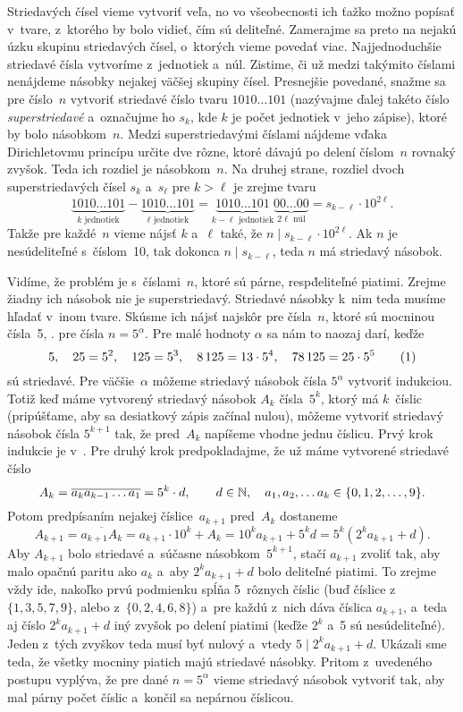 {%
Striedavých čísel vieme vytvoriť veľa, no vo všeobecnosti ich ťažko možno popísať v~tvare, z~ktorého by bolo vidieť, čím sú deliteľné. Zamerajme sa preto na nejakú úzku skupinu striedavých čísel, o~ktorých vieme povedať viac. Najjednoduchšie striedavé čísla vytvoríme z~jednotiek a~núl. Zistime, či už medzi takýmito číslami nenájdeme násobky nejakej väčšej skupiny čísel. Presnejšie povedané, snažme sa pre číslo~$n$ vytvoriť striedavé číslo tvaru $1010\dots101$ (nazývajme ďalej takéto číslo {\it superstriedavé} a~označujme ho $s_k$, kde $k$ je počet jednotiek v~jeho zápise), ktoré by bolo násobkom~$n$. Medzi superstriedavými číslami nájdeme vďaka Dirichletovmu princípu určite dve rôzne, ktoré dávajú po delení číslom~$n$ rovnaký zvyšok. Teda ich rozdiel je násobkom~$n$. Na druhej strane, rozdiel dvoch superstriedavých čísel $s_k$ a~$s_\ell$ pre $k>\ell$ je zrejme tvaru
$$
\underbrace{1010\dots101}_{\text{$k$ jednotiek}}-\underbrace{1010\dots101}_{\text{$\ell$ jednotiek}}=
\underbrace{1010\dots101}_{\text{$k-\ell$ jednotiek}}\!\underbrace{00\dots00}_{\text{$2\ell$ núl}}=
s_{k-\ell}\cdot10^{2\ell}.
$$
Takže pre každé~$n$ vieme nájsť $k$ a~$\ell$ také, že $n\mid s_{k-\ell}\cdot10^{2\ell}$. Ak $n$ je nesúdeliteľné s~číslom~10, tak dokonca $n\mid s_{k-\ell}$, teda $n$ má striedavý násobok. 

Vidíme, že problém je s~číslami~$n$, ktoré sú párne, resp\. deliteľné piatimi. Zrejme žiadny ich násobok nie je superstriedavý. Striedavé násobky k~nim teda musíme hľadať v~inom tvare. Skúsme ich nájsť najskôr pre čísla~$n$, ktoré sú mocninou čísla~5, \tj. pre čísla $n=5^\alpha$. Pre malé hodnoty $\alpha$ sa nám to naozaj darí, keďže
$$
5,\quad 25=5^2,\quad 125=5^3,\quad 8\,125=13\cdot5^4,\quad 78\,125=25\cdot5^5
\tag1
$$
sú striedavé. Pre väčšie~$\alpha$ môžeme striedavý násobok čísla $5^\alpha$ vytvoriť indukciou. Totiž keď máme vytvorený striedavý násobok $A_k$ čísla~$5^k$, ktorý má $k$~číslic (pripúšťame, aby sa desiatkový zápis začínal nulou), môžeme vytvoriť striedavý násobok čísla $5^{k+1}$ tak, že pred~$A_k$ napíšeme vhodne jednu číslicu. Prvý krok indukcie je v~. Pre druhý krok predpokladajme, že už máme vytvorené striedavé číslo
$$
A_k=\overline{a_ka_{k-1}\dots a_1}=5^k\cdot d,\qquad d\in\Bbb N,\quad
a_1,a_2,\dots a_k\in\{0,1,2,\dots,9\}.
$$
Potom predpísaním nejakej číslice~$a_{k+1}$ pred~$A_k$ dostaneme
$$
A_{k+1}=\overline{a_{k+1}A_k}=a_{k+1}\cdot10^k+A_k=10^ka_{k+1}+5^kd=5^k(2^ka_{k+1}+d).
$$
Aby $A_{k+1}$ bolo striedavé a~súčasne násobkom~$5^{k+1}$, stačí $a_{k+1}$ zvoliť tak, aby malo opačnú paritu ako $a_k$ a~aby $2^ka_{k+1}+d$ bolo deliteľné piatimi. To zrejme vždy ide, nakoľko prvú podmienku spĺňa 5~rôznych číslic (buď číslice z~$\{1,3,5,7,9\}$, alebo z~$\{0,2,4,6,8\}$) a~pre každú z~nich dáva číslica $a_{k+1}$, a~teda aj číslo $2^ka_{k+1}+d$ iný zvyšok po delení piatimi (keďže $2^k$ a~5 sú nesúdeliteľné). Jeden z~tých zvyškov teda musí byť nulový a~vtedy $5\mid2^ka_{k+1}+d$. Ukázali sme teda, že všetky mocniny piatich majú striedavé násobky. Pritom z~uvedeného postupu vyplýva, že pre dané $n=5^\alpha$ vieme striedavý násobok vytvoriť tak, aby mal párny počet číslic a~končil sa nepárnou číslicou.

}
